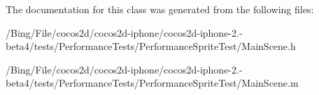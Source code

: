 The documentation for this class was generated from the following files\-:\begin{DoxyCompactItemize}
\item 
/\-Bing/\-File/cocos2d/cocos2d-\/iphone/cocos2d-\/iphone-\/2.-\/beta4/tests/\-Performance\-Tests/\-Performance\-Sprite\-Test/Main\-Scene.\-h\item 
/\-Bing/\-File/cocos2d/cocos2d-\/iphone/cocos2d-\/iphone-\/2.-\/beta4/tests/\-Performance\-Tests/\-Performance\-Sprite\-Test/Main\-Scene.\-m\end{DoxyCompactItemize}
